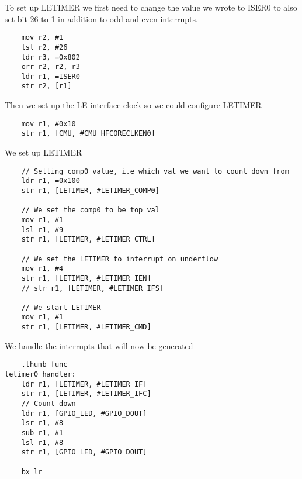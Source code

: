 To set up LETIMER we first need to change the value we wrote to ISER0 to also set bit 26 to 1 in addition to odd and even interrupts.

\begin{lstlisting}
   	mov r2, #1
	lsl r2, #26
	ldr r3, =0x802
	orr r2, r2, r3
	ldr r1, =ISER0
	str r2, [r1]
\end{lstlisting}

Then we set up the LE interface clock so we could configure LETIMER

\begin{lstlisting}
	mov r1, #0x10
	str r1, [CMU, #CMU_HFCORECLKEN0]
\end{lstlisting}

We set up LETIMER

\begin{lstlisting}
	// Setting comp0 value, i.e which val we want to count down from
	ldr r1, =0x100
	str r1, [LETIMER, #LETIMER_COMP0]

	// We set the comp0 to be top val
	mov r1, #1
	lsl r1, #9
	str r1, [LETIMER, #LETIMER_CTRL]

	// We set the LETIMER to interrupt on underflow
	mov r1, #4
	str r1, [LETIMER, #LETIMER_IEN]
	// str r1, [LETIMER, #LETIMER_IFS]

	// We start LETIMER
	mov r1, #1
	str r1, [LETIMER, #LETIMER_CMD]
\end{lstlisting}


We handle the interrupts that will now be generated

\begin{lstlisting}
	.thumb_func
letimer0_handler:
	ldr r1, [LETIMER, #LETIMER_IF] 
	str r1, [LETIMER, #LETIMER_IFC]
	// Count down
	ldr r1, [GPIO_LED, #GPIO_DOUT]
	lsr r1, #8
	sub r1, #1
	lsl r1, #8
	str r1, [GPIO_LED, #GPIO_DOUT]

	bx lr
\end{lstlisting}
